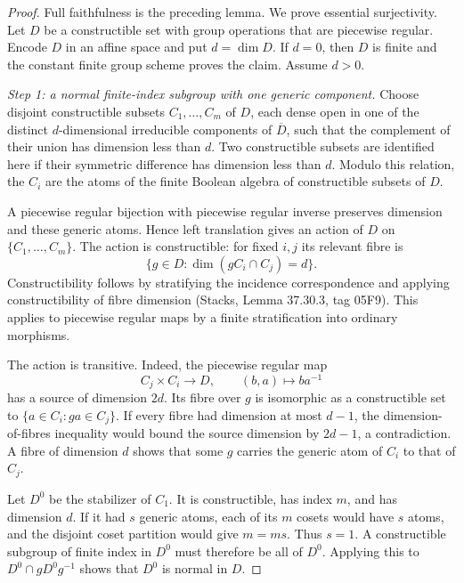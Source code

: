 \begin{proof}
Full faithfulness is the preceding lemma.  We prove essential surjectivity.
Let $D$ be a constructible set with group operations that are piecewise
regular.  Encode $D$ in an affine space and put $d=\dim D$.  If $d=0$,
then $D$ is finite and the constant finite group scheme proves the claim.
Assume $d>0$.

\emph{Step 1: a normal finite-index subgroup with one generic component.}
Choose disjoint constructible subsets $C_1,\ldots,C_m$ of $D$, each dense
open in one of the distinct $d$-dimensional irreducible components of
$\overline D$, such that the complement of their union has dimension less
than $d$.  Two constructible subsets are identified here if their
symmetric difference has dimension less than $d$.  Modulo this relation,
the $C_i$ are the atoms of the finite Boolean algebra of constructible
subsets of $D$.

A piecewise regular bijection with piecewise regular inverse preserves
dimension and these generic atoms.  Hence left translation gives an
action of $D$ on $\{C_1,\ldots,C_m\}$.  The action is constructible: for
fixed $i,j$ its relevant fibre is
\[
 \{g\in D:\dim(gC_i\cap C_j)=d\}.
\]
Constructibility follows by stratifying the incidence correspondence and
applying constructibility of fibre dimension (Stacks, Lemma 37.30.3,
tag 05F9)\cite[tag 05F9]{BStacks}.  This applies to piecewise regular maps by a finite
stratification into ordinary morphisms.

The action is transitive.  Indeed, the piecewise regular map
\[
 C_j\times C_i\longrightarrow D,\qquad (b,a)\longmapsto ba^{-1}
\]
has a source of dimension $2d$.  Its fibre over $g$ is isomorphic as a
constructible set to $\{a\in C_i:ga\in C_j\}$.  If every fibre had
dimension at most $d-1$, the dimension-of-fibres inequality would bound
the source dimension by $2d-1$, a contradiction.  A fibre of dimension
$d$ shows that some $g$ carries the generic atom of $C_i$ to that of $C_j$.

Let $D^0$ be the stabilizer of $C_1$.  It is constructible, has index $m$,
and has dimension $d$.  If it had $s$ generic atoms, each of its $m$
cosets would have $s$ atoms, and the disjoint coset partition would give
$m=ms$.  Thus $s=1$.  A constructible subgroup of finite index in $D^0$
must therefore be all of $D^0$.  Applying this to
$D^0\cap gD^0g^{-1}$ shows that $D^0$ is normal in $D$.


\end{proof}
